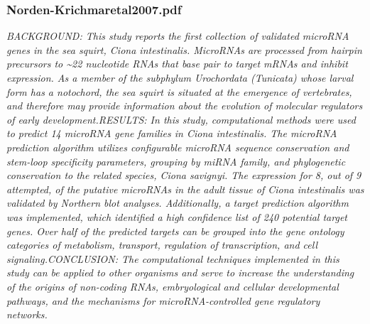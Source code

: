 \documentclass[graybox]{svmult}
\begin{document}
\subsubsection{Norden-Krichmaretal2007.pdf}
\cite{Norden-Krichmar2007}
\textit{BACKGROUND: This study reports the first collection of validated microRNA genes in the sea squirt, Ciona intestinalis. MicroRNAs are processed from hairpin precursors to {\~{}}22 nucleotide RNAs that base pair to target mRNAs and inhibit expression. As a member of the subphylum Urochordata (Tunicata) whose larval form has a notochord, the sea squirt is situated at the emergence of vertebrates, and therefore may provide information about the evolution of molecular regulators of early development.RESULTS: In this study, computational methods were used to predict 14 microRNA gene families in Ciona intestinalis. The microRNA prediction algorithm utilizes configurable microRNA sequence conservation and stem-loop specificity parameters, grouping by miRNA family, and phylogenetic conservation to the related species, Ciona savignyi. The expression for 8, out of 9 attempted, of the putative microRNAs in the adult tissue of Ciona intestinalis was validated by Northern blot analyses. Additionally, a target prediction algorithm was implemented, which identified a high confidence list of 240 potential target genes. Over half of the predicted targets can be grouped into the gene ontology categories of metabolism, transport, regulation of transcription, and cell signaling.CONCLUSION: The computational techniques implemented in this study can be applied to other organisms and serve to increase the understanding of the origins of non-coding RNAs, embryological and cellular developmental pathways, and the mechanisms for microRNA-controlled gene regulatory networks.}
\end{document}
